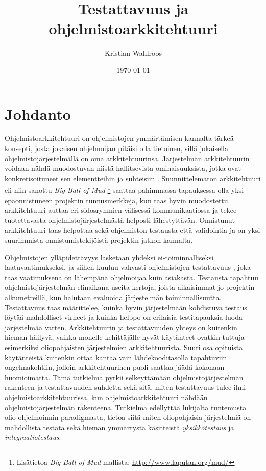 \documentclass[finnish]{tktltiki2}
\title{Testattavuus ja ohjelmistoarkkitehtuuri}
\author{Kristian Wahlroos}
\date{\today}
\numberwithin{table}{section}
\theoremstyle{definition}
\theoremstyle{remark}
\begin{document}
\renewcommand*{\harvardand}{\&}

\frontmatter      %

\maketitle        %
\makeabstract     %

\tableofcontents  %


\mainmatter       %

\section{Johdanto}


Ohjelmistoarkkitehtuuri on ohjelmistojen ymmärtämisen kannalta tärkeä konsepti, josta jokaisen ohjelmoijan pitäisi olla tietoinen, sillä jokaisella ohjelmistojärjestelmällä on oma arkkitehtuurinsa. Järjestelmän arkkitehtuurin voidaan nähdä muodostuvan niistä hallitsevista ominaisuuksista, jotka ovat konkretisoituneet sen elementteihin ja suhteisiin \citep[s. 2]{ISOIEEE42010}. Suunnittelematon arkkitehtuuri eli niin sanottu \textit{Big Ball of Mud} \footnote{Lisätietoa \textit{Big Ball of Mud}-mallista: \url{http://www.laputan.org/mud/}} saattaa pahimmassa tapauksessa olla yksi epäonnistuneen projektin tunnusmerkkejä, kun taas hyvin muodostettu arkkitehtuuri auttaa eri sidosryhmien välisessä kommunikaatiossa ja tekee tuotettavasta ohjelmistojärjestelmästä helposti lähestyttävän. Onnistunut arkkitehtuuri taas helpottaa sekä ohjelmiston testausta että validointia ja on yksi suurimmista onnistumistekijöistä projektin jatkon kannalta. 

Ohjelmistojen ylläpidettävyys lasketaan yhdeksi ei-toiminnalliseksi laatuvaatimukseksi, ja siihen kuuluu vahvasti ohjelmistojen testattavuus \citep{ISO/IEC25010:2011}, joka taas vaatimuksena on lähempänä ohjelmoijaa kuin asiakasta. Testausta tapahtuu ohjelmistojärjestelmän elinaikana useita kertoja, joista  aikaisimmat jo projektin alkumetreillä, kun halutaan evaluoida järjestelmän toiminnallisuutta. Testattavuus taas määrittelee, kuinka hyvin järjestelmään kohdistuva testaus löytää mahdolliset virheet ja kuinka helppo on erilaisia testitapauksia luoda järjestelmää varten. Arkkitehtuurin ja testattavuuden yhteys on kuitenkin hieman häilyvä, vaikka monelle kehittäjälle hyvät käytänteet ovatkin tuttuja esimerkiksi oliopohjaisten järjestelmien arkkitehtuurista. Suuri osa opituista käytänteistä kuitenkin ottaa kantaa vain lähdekooditasolla tapahtuviin ongelmakohtiin, jolloin arkkitehtuurinen puoli saattaa jäädä kokonaan huomioimatta. Tämä tutkielma pyrkii selkeyttämään ohjelmistojärjestelmän rakenteen ja testattavuuden suhdetta sekä sitä, miten testattavuus tulee ilmi ohjelmistoarkkitehtuurissa, kun ohjelmistoarkkitehtuuri nähdään ohjelmistojärjestelmän rakenteena. Tutkielma edellyttää lukijalta tuntemusta olio-ohjelmoinnin paradigmasta, tietoa siitä miten oliopohjaisia järjestelmiä on mahdollista testata sekä hieman ymmärrystä käsitteistä \textit{yksikkötestaus} ja \textit{integraatiotestaus}. 
\end{document}

